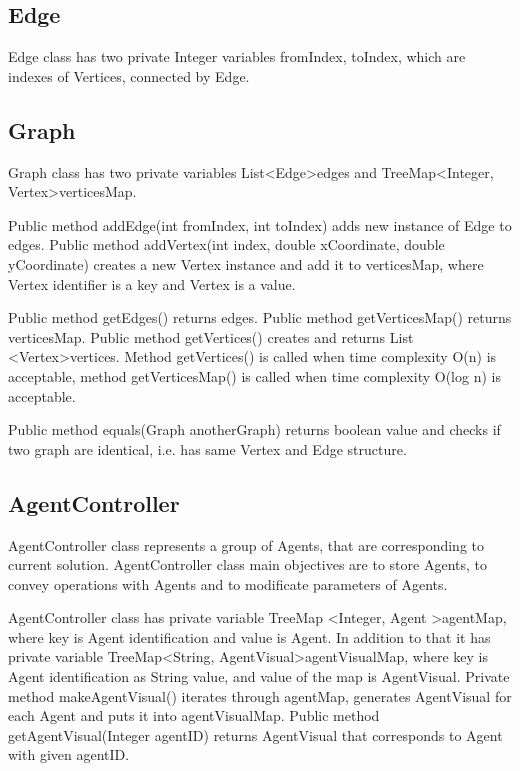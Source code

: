 \documentclass[thesis=B,english]{FITthesis}[2019/12/23]
\begin{document}
\subsection{Edge}

Edge class has two private Integer variables fromIndex, toIndex, which are indexes of Vertices, connected by Edge.

\subsection{Graph}

Graph class has two private variables List\textless Edge\textgreater edges and TreeMap\textless Integer, Vertex\textgreater verticesMap.

Public method addEdge(int fromIndex, int toIndex) adds new instance of Edge to edges.
Public method addVertex(int index, double xCoordinate, double yCoordinate) creates a new Vertex instance and add it to verticesMap, where Vertex identifier is a key and Vertex is a value.

Public method getEdges() returns edges. Public method getVerticesMap()
returns verticesMap. Public method getVertices() creates and returns List \textless Vertex\textgreater vertices. Method getVertices() is called when time complexity O(n) is acceptable, method getVerticesMap() is called when time complexity O(log n) is acceptable. 

Public method equals(Graph anotherGraph) returns boolean value and checks if two graph are identical, i.e. has same Vertex and Edge structure.

\subsection{AgentController}

AgentController class represents a group of Agents, that are corresponding to current solution. AgentController class main
 objectives are to store Agents, to convey operations with Agents and to modificate parameters of Agents.

AgentController class has private variable TreeMap \textless Integer, Agent \textgreater agentMap, where key is Agent identification and value is Agent. In addition to that it has private variable TreeMap\textless String,  AgentVisual\textgreater  agentVisualMap, where key is Agent identification as String value, and value of the map is AgentVisual. Private method makeAgentVisual() iterates through agentMap, generates AgentVisual for each Agent and puts it into agentVisualMap. Public method getAgentVisual(Integer agentID) returns AgentVisual that corresponds to Agent with given agentID.
\end{document}
